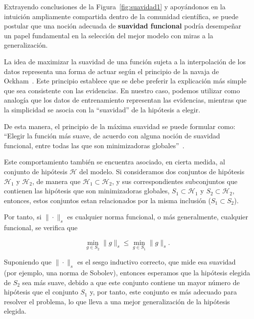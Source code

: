 Extrayendo conclusiones de la Figura~\ref{fig:suavidad1} y apoyándonos en la intuición ampliamente compartida dentro de la comunidad científica, se puede postular que una noción adecuada de \textbf{suavidad funcional} podría desempeñar un papel fundamental en la selección del mejor modelo con miras a la generalización.\newline  

La idea de maximizar la suavidad de una función sujeta a la interpolación de los datos representa una forma de actuar según el principio de la navaja de Ockham~\cite{Blumer1987}. Este principio establece que se debe preferir la explicación más simple que sea consistente con las evidencias. En nuestro caso, podemos utilizar como analogía que los datos de entrenamiento representan las evidencias, mientras que la simplicidad se asocia con la ``suavidad'' de la hipótesis a elegir.\newline

De esta manera, el principio de la máxima suavidad se puede formular como: ``Elegir la función más suave, de acuerdo con alguna noción de suavidad funcional, entre todas las que son minimizadoras globales''~\cite{Belkin2021}.\newline

Este comportamiento también se encuentra asociado, en cierta medida, al conjunto de hipótesis $\mathcal{H}$ del modelo. Si consideramos dos conjuntos de hipótesis $\mathcal{H}_1$ y $\mathcal{H}_2$, de manera que $\mathcal{H}_1 \subset \mathcal{H}_2$, y sus correspondientes subconjuntos que contienen las hipótesis que son minimizadoras globales, $S_1 \subset \mathcal{H}_1$ y $S_2 \subset \mathcal{H}_2$, entonces, estos conjuntos estan relacionados por la misma inclusión ($S_1 \subset S_2$).\newline

Por tanto, si $\| \cdot \|_{s}$ es cualquier norma funcional, o más generalmente, cualquier funcional, se verifica que

\[
    \min_{g \in S_2} \| g \|_{s} \leq \min_{g \in S_1} \| g \|_{s}.
\]

Suponiendo que $\| \cdot \|_{s}$ es el sesgo inductivo correcto, que mide esa suavidad (por ejemplo, una norma de Sobolev), entonces esperamos que la hipótesis elegida de $S_2$ sea más suave, debido a que este conjunto contiene un mayor número de hipótesis que el conjunto $S_1$ y, por tanto, este conjunto es más adecuado para resolver el problema, lo que lleva a una mejor generalización de la hipótesis elegida.\newline

